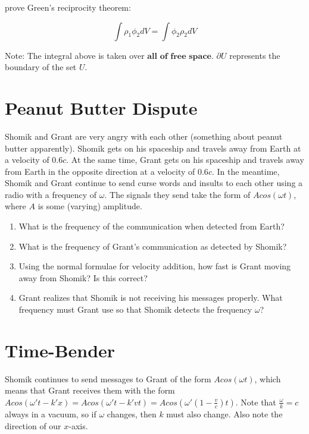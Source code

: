 \documentclass{article}
\begin{document}
prove Green's reciprocity theorem:

\[
\int \rho_1\phi_2 dV = \int \phi_2\rho_2 dV
\]

Note: The integral above is taken over $\textbf{all of free space}$. $\partial U$ represents the boundary of the set $U$.


\section{Peanut Butter Dispute}

Shomik and Grant are very angry with each other (something about peanut butter apparently). Shomik gets on his spaceship and travels away from Earth at a velocity of $0.6c$.  At the same time, Grant gets on his spaceship and travels away from Earth in the opposite direction at a velocity of $0.6c$. In the meantime, Shomik and Grant continue to send curse words and insults to each other using a radio with a frequency of $\omega$. The signals they send take the form of $Acos(\omega t)$, where $A$ is some (varying) amplitude.

\begin{enumerate}[label=(\alph*)]
    \item What is the frequency of the communication when detected from Earth?
    
    \item What is the frequency of Grant's communication as detected by Shomik?
    
    \item Using the normal formulae for velocity addition, how fast is Grant moving away from Shomik? Is this correct?
    
    \item Grant realizes that Shomik is not receiving his messages properly. What frequency must Grant use so that Shomik detects the frequency $\omega$?

\end{enumerate}

\newpage

\section{Time-Bender}

Shomik continues to send messages to Grant of the form $Acos(\omega t)$, which means that Grant receives them with the form $Acos(\omega' t - k'x) = Acos(\omega' t - k'vt) = Acos(\omega' \left(1 - \frac{v}{c} \right) t)$. Note that $\frac{\omega}{k} = c$ always in a vacuum, so if $\omega$ changes, then $k$ must also change. Also note the direction of our $x$-axis.
\end{document}

